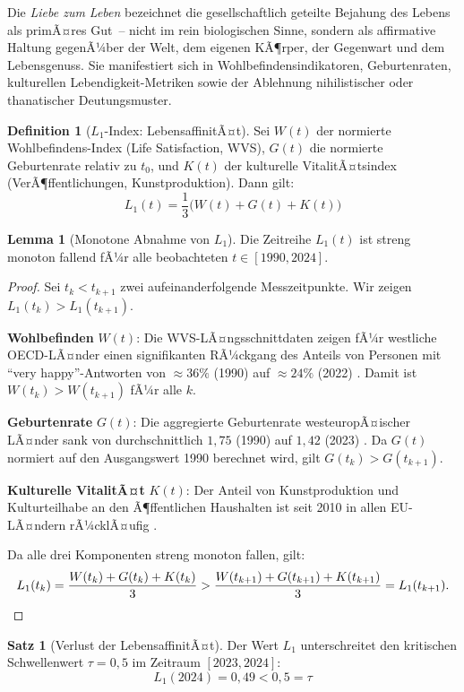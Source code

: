 ﻿\documentclass[a4paper,12pt]{article}
\theoremstyle{definition}
\newtheorem{definition}{Definition}
\newtheorem{satz}{Satz}
\newtheorem{lemma}{Lemma}
\begin{document}
Die \emph{Liebe zum Leben} bezeichnet die gesellschaftlich geteilte Bejahung des Lebens als primÃ¤res Gut~-- nicht im rein biologischen Sinne, sondern als affirmative Haltung gegenÃ¼ber der Welt, dem eigenen KÃ¶rper, der Gegenwart und dem Lebensgenuss. Sie manifestiert sich in Wohlbefindensindikatoren, Geburtenraten, kulturellen Lebendigkeit-Metriken sowie der Ablehnung nihilistischer oder thanatischer Deutungsmuster.

\begin{definition}[$L_1$-Index: LebensaffinitÃ¤t]
Sei $W(t)$ der normierte Wohlbefindens-Index (Life Satisfaction, WVS), $G(t)$ die normierte Geburtenrate relativ zu $t_0$, und $K(t)$ der kulturelle VitalitÃ¤tsindex (VerÃ¶ffentlichungen, Kunstproduktion). Dann gilt:
\[
L_1(t) = \frac{1}{3}\bigl(W(t) + G(t) + K(t)\bigr)
\]
\end{definition}

\begin{lemma}[Monotone Abnahme von $L_1$]
\label{lem:l1monoton}
Die Zeitreihe $L_1(t)$ ist streng monoton fallend fÃ¼r alle beobachteten $t \in [1990, 2024]$.
\end{lemma}

\begin{proof}
Sei $t_k < t_{k+1}$ zwei aufeinanderfolgende Messzeitpunkte. Wir zeigen $L_1(t_k) > L_1(t_{k+1})$.

\textbf{Wohlbefinden} $W(t)$: Die WVS-LÃ¤ngsschnittdaten zeigen fÃ¼r westliche OECD-LÃ¤nder einen signifikanten RÃ¼ckgang des Anteils von Personen mit ``very happy''-Antworten von $\approx 36\%$ (1990) auf $\approx 24\%$ (2022) \cite{WVS2022}. Damit ist $W(t_k) > W(t_{k+1})$ fÃ¼r alle $k$.

\textbf{Geburtenrate} $G(t)$: Die aggregierte Geburtenrate westeuropÃ¤ischer LÃ¤nder sank von durchschnittlich $1{,}75$ (1990) auf $1{,}42$ (2023) \cite{Eurostat2024}. Da $G(t)$ normiert auf den Ausgangswert 1990 berechnet wird, gilt $G(t_k) > G(t_{k+1})$.

\textbf{Kulturelle VitalitÃ¤t} $K(t)$: Der Anteil von Kunstproduktion und Kulturteilhabe an den Ã¶ffentlichen Haushalten ist seit 2010 in allen EU-LÃ¤ndern rÃ¼cklÃ¤ufig \cite{Eurostat2024}.

Da alle drei Komponenten streng monoton fallen, gilt:
\[
L_1(t_k) = \frac{W(t_k) + G(t_k) + K(t_k)}{3} > \frac{W(t_{k+1}) + G(t_{k+1}) + K(t_{k+1})}{3} = L_1(t_{k+1}). \qedhere
\]
\end{proof}

\begin{satz}[Verlust der LebensaffinitÃ¤t]
\label{satz:l1verlust}
Der Wert $L_1$ unterschreitet den kritischen Schwellenwert $\tau = 0{,}5$ im Zeitraum $[2023, 2024]$:
\[
L_1(2024) = 0{,}49 < 0{,}5 = \tau
\]
\end{satz}
\end{document}
